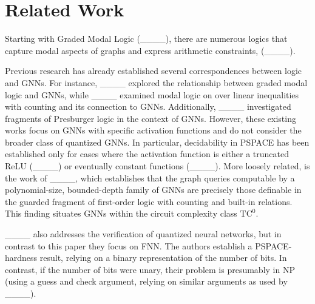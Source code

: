 \section{Related Work}
\label{sec:relatedwork}
Starting with Graded Modal Logic  (____),
there are numerous logics that capture modal aspects of graphs and express arithmetic constraints, (____). 

Previous research has already established several correspondences between logic and GNNs. For instance, ____ explored the relationship between graded modal logic and GNNs, while ____ examined modal logic on over linear inequalities with counting and its connection to GNNs. Additionally, ____ investigated fragments of Presburger logic in the context of GNNs. However, these existing works focus on GNNs with specific activation functions and do not consider the broader class of quantized GNNs. In particular, decidability in PSPACE has been established only for cases where the activation function is either a truncated ReLU (____) or eventually constant functions (____). 
More loosely related, is the work of ____, which establishes that the graph queries computable by a polynomial-size, bounded-depth family of GNNs are precisely those definable in the guarded fragment    of first-order logic with counting and built-in relations. This finding situates GNNs within the circuit complexity class  $\text{TC}^0$.


____ also addresses the verification of quantized neural networks, but in contrast to this paper they focus on FNN. The authors establish a PSPACE-hardness result, relying on a binary representation of the number of bits. In contrast, if the number of bits were unary, their problem is presumably in NP (using a guess and check argument, relying on similar arguments as used by ____).

